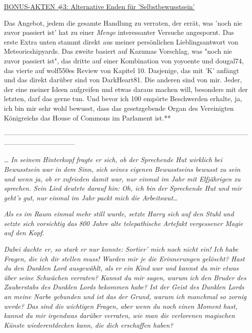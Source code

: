 {\uline{BONUS-AKTEN \#3: Alternative Enden für 'Selbstbewusstsein'}

Das Angebot, jedem die gesamte Handlung zu verraten, der errät, was 'noch nie zuvor passiert ist' hat zu einer \emph{Menge} interessanter Versuche angespornt. Das erste Extra unten stammt direkt aus meiner persönlichen Lieblingsantwort von Meteoricshipyards. Das zweite basiert auf Kazumas Vorschlag, was "noch nie zuvor passiert ist", das dritte auf einer Kombination von yoyoente und dougal74, das vierte auf wolf550es Review von Kapitel 10. Dasjenige, das mit 'K' anfängt und das direkt darüber sind von DarkHeart81. Die anderen sind von mir. Jeder, der eine meiner Ideen aufgreifen und etwas daraus machen will, besonders mit der letzten, darf das gerne tun. Und bevor ich 100 empörte Beschwerden erhalte, ja, ich bin mir sehr wohl bewusst, dass das gesetzgebende Organ des Vereinigten Königreichs das House of Commons im Parlament ist.**

--------------------------------------------------------------------------------------------------------------------------------------------

\emph{… In seinem Hinterkopf} \emph{fragte er sich, ob der Sprechende Hut wirklich} \emph{\emph{bei Bewusstsein}} \emph{war in dem Sinn, sich seines eigenen Bewusstseins bewusst zu sein und wenn ja, ob er zufrieden damit war, nur einmal im Jahr mit Elfjährigen zu sprechen. Sein Lied deutete darauf hin:} \emph{\emph{Oh, ich bin der Sprechende Hut und mir geht}\emph{'}\emph{s gut,}} \emph{\emph{nur}} \emph{\emph{einmal im Jahr}} \emph{\emph{packt mich}} \emph{\emph{die Arbeitswut}\emph{…}}

\emph{Als es im Raum einmal mehr still wurde, setzte Harry sich auf den Stuhl und setzte sich} \emph{\emph{vorsichtig}} \emph{das 800 Jahre alte telepathische Artefakt vergessener Magie auf den Kopf.}

\emph{Dabei dachte er, so stark er nur konnte:} \emph{\emph{Sortier' mich noch nicht ein! Ich habe Fragen, die ich dir stellen muss! Wurden mir je die Erinnerungen gelöscht? Hast du den Dunklen Lord ausgewählt, als er ein Kind war und kannst du mir etwas über seine Schwächen verraten? Kannst du mir sagen, warum ich den Bruder des Zauberstabs des Dunklen Lords bekommen habe? Ist der Geist des Dunklen Lords an meine Narbe gebunden und ist das der Grund, warum ich manchmal so zornig werde? Das sind die wichtigen Fragen, aber wenn du noch einen Moment hast, kannst du mir irgendwas darüber verraten, wie man die verlorenen magischen Künste wiederentdecken kann, die dich erschaffen haben?}}

}
